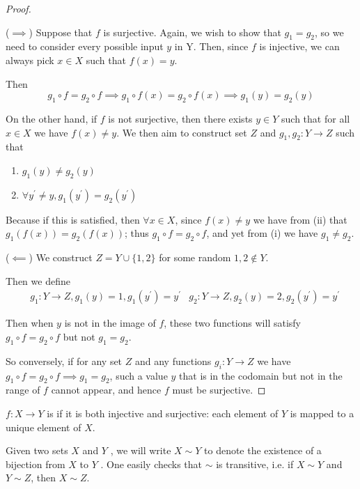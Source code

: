 \begin{proof} \

($\implies$) Suppose that $f$ is surjective. Again, we wish to show that $g_1=g_2$, so we need to consider every possible input $y$ in Y. Then, since $f$ is injective, we can always pick $x \in X$ such that $f(x)=y$.

Then
\[ g_1 \circ f=g_2 \circ f \implies g_1 \circ f(x)=g_2 \circ f(x) \implies g_1(y)=g_2(y) \]

On the other hand, if $f$ is not surjective, then there exists $y \in Y$ such that for all $x \in X$ we have $f(x)\neq y$. We then aim to construct set $Z$ and $g_1,g_2:Y\to Z$ such that
\begin{enumerate}[label=(\roman*)]
\item $g_1(y) \neq g_2(y)$
\item $\forall y^\prime \neq y, g_1(y^\prime)=g_2(y^\prime)$
\end{enumerate}

Because if this is satisfied, then $\forall x \in X$, since $f(x)\neq y$ we have from (ii) that $g_1(f(x))=g_2(f(x))$; thus $g_1 \circ f=g_2 \circ f$, and yet from (i) we have $g_1 \neq g_2$.

($\impliedby$) We construct $Z=Y\cup\{1,2\}$ for some random $1,2 \notin Y$.

Then we define
\begin{align*}
&g_1:Y\to Z,g_1(y)=1,g_1(y^\prime)=y^\prime
&g_2:Y\to Z,g_2(y)=2,g_2(y^\prime)=y^\prime
\end{align*}

Then when $y$ is not in the image of $f$, these two functions will satisfy $g_1 \circ f=g_2 \circ f$ but not $g_1=g_2$.

So conversely, if for any set $Z$ and any functions $g_i:Y \to Z$ we have $g_1 \circ f=g_2 \circ f \implies g_1=g_2$, such a value $y$ that is in the codomain but not in the range of $f$ cannot appear, and hence $f$ must be surjective.
\end{proof}

\begin{definition}
$f:X\to Y$ is  if it is both injective and surjective: each element of $Y$ is mapped to a unique element of $X$.
\end{definition}

\begin{notation}
Given two sets $X$ and $Y$ , we will write $X\sim Y$ to denote the existence of a bijection from $X$ to $Y$ . One easily checks that $\sim$ is transitive, i.e. if $X\sim Y$ and $Y\sim Z$, then $X\sim Z$.
\end{notation}

